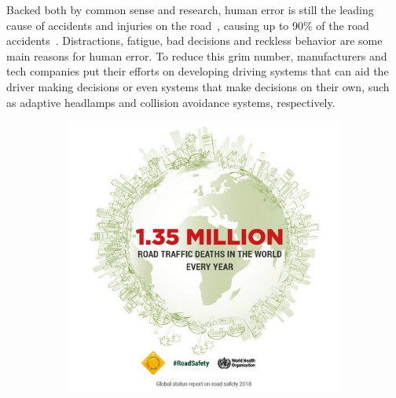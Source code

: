 Backed both by common sense and research, human error is still the leading cause of accidents and injuries on the road~\cite{Bimbraw2015, WHO2018}, causing up to 90\% of the road accidents~\cite{WHO2018}. Distractions, fatigue, bad decisions and reckless behavior are some main reasons for human error. To reduce this grim number, manufacturers and tech companies put their efforts on developing driving systems that can aid the driver making decisions or even systems that make decisions on their own, such as adaptive headlamps and collision avoidance systems, respectively.


\begin{figure}[H]
	\centering
	\begin{subfigure}[c]{0.3\textwidth}
		\includegraphics[width=\textwidth]{img/road_safety/1_35-million.jpg}
		\label{fig:test_image_1}
	\end{subfigure}
	\quad
	\begin{subfigure}[c]{0.3\textwidth}

\end{subfigure}
\end{figure}
